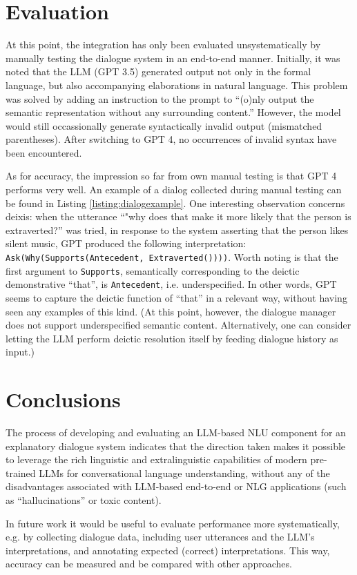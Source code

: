 \documentclass[11pt]{article}
\begin{document}
\section{Evaluation}
\label{sec:evaluation}
At this point, the integration has only been evaluated unsystematically by manually testing the dialogue system in an end-to-end manner. Initially, it was noted that the LLM (GPT 3.5) generated output not only in the formal language, but also accompanying elaborations in natural language. This problem was solved by adding an instruction to the prompt to ``(o)nly output the semantic representation without any surrounding content.'' However, the model would still occassionally generate syntactically invalid output (mismatched parentheses). After switching to GPT 4, no occurrences of invalid syntax have been encountered.

As for accuracy, the impression so far from own manual testing is that GPT 4 performs very well. An example of a dialog collected during manual testing can be found in Listing \ref{listing:dialogexample}. One interesting observation concerns deixis: when the utterance ``"why does that make it more likely that the person is extraverted?'' was tried, in response to the system asserting that the person likes silent music, GPT produced the following interpretation: \texttt{Ask(Why(Supports(Antecedent, Extraverted())))}. Worth noting is that the first argument to \texttt{Supports}, semantically corresponding to the deictic demonstrative ``that'', is \texttt{Antecedent}, i.e. underspecified. In other words, GPT seems to capture the deictic function of ``that'' in a relevant way, without having seen any examples of this kind. (At this point, however, the dialogue manager does not support underspecified semantic content. Alternatively, one can consider letting the LLM perform deictic resolution itself by feeding dialogue history as input.)



\section{Conclusions}
The process of developing and evaluating an LLM-based NLU component for an explanatory dialogue system indicates that the direction taken makes it possible to leverage the rich linguistic and extralinguistic capabilities of modern pre-trained LLMs for conversational language understanding, without any of the disadvantages associated with LLM-based end-to-end or NLG applications (such as ``hallucinations'' or toxic content).

In future work it would be useful to evaluate performance more systematically, e.g. by collecting dialogue data, including user utterances and the LLM's interpretations, and annotating expected (correct) interpretations. This way, accuracy can be measured and be compared with other approaches.
\end{document}
